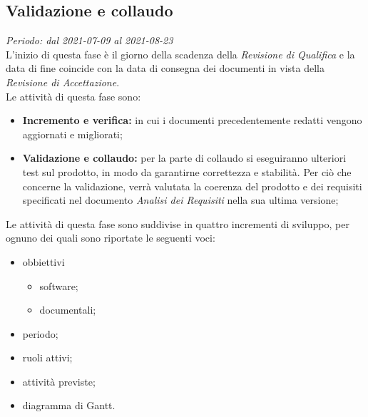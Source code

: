 \subsection{Validazione e collaudo}
\textit{Periodo: dal 2021-07-09 al 2021-08-23}\\
L'inizio di questa fase è il giorno della scadenza della \textit{Revisione di Qualifica} e la data di fine coincide con la data di consegna dei documenti in vista della \textit{Revisione di Accettazione}.\\
Le attività di questa fase sono:
\begin{itemize}
    \item \textbf{Incremento e verifica:} in cui i documenti precedentemente redatti vengono aggiornati e migliorati;
    \item \textbf{Validazione e collaudo:} per la parte di collaudo si eseguiranno ulteriori test sul prodotto, in modo da garantirne correttezza e stabilità. Per ciò che concerne la validazione, verrà valutata la coerenza del prodotto e dei requisiti specificati nel documento \textit{Analisi dei Requisiti} nella sua ultima versione;
\end{itemize}
Le attività di questa fase sono suddivise in quattro incrementi di sviluppo, per ognuno dei quali sono riportate le seguenti voci:
\begin{itemize}
    \item obbiettivi
          \begin{itemize}
              \item software;
              \item documentali;
          \end{itemize}
    \item periodo;
    \item ruoli attivi;
    \item attività previste;
    \item diagramma di Gantt.
\end{itemize}

